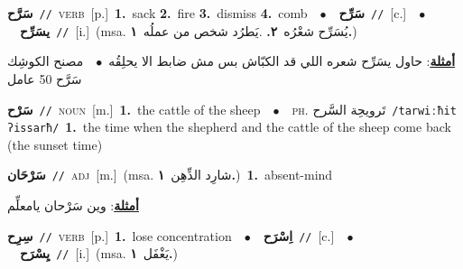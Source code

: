 \documentclass[10pt,a4paper,twoside]{article} %
\begin{document}
\begin{multicols}{2}
{\setlength\topsep{0pt}\textbf{\foreignlanguage{arabic}{سَرَّح}}\ {\color{gray}\texttt{//}\color{black}}\ \textsc{verb}\ [p.]\ \textbf{1.}~sack  \textbf{2.}~fire  \textbf{3.}~dismiss  \textbf{4.}~comb\ \ $\bullet$\ \ \setlength\topsep{0pt}\textbf{\foreignlanguage{arabic}{سَرِّح}}\ {\color{gray}\texttt{//}\color{black}}\ [c.]\ \ $\bullet$\ \ \setlength\topsep{0pt}\textbf{\foreignlanguage{arabic}{يسَرِّح}}\ {\color{gray}\texttt{//}\color{black}}\ [i.]\ \color{gray}(msa. \foreignlanguage{arabic}{يُسَرِّح شعْرُه}~\foreignlanguage{arabic}{\textbf{٢.}}  .\foreignlanguage{arabic}{يَطرُد شخص من عملُه}~\foreignlanguage{arabic}{\textbf{١.}})\color{black}\  \begin{flushright}\color{gray}\foreignlanguage{arabic}{\textbf{\underline{\foreignlanguage{arabic}{أمثلة}}}: حاول يسَرِّح شعره اللي قد الكبّاش بس مش ضابط الا يحلِقُه\ $\bullet$\ \  مصنح الكوشِك سَرَّح 50 عامل}\end{flushright}\color{black}} \vspace{2mm}

{\setlength\topsep{0pt}\textbf{\foreignlanguage{arabic}{سَرْح}}\ {\color{gray}\texttt{//}\color{black}}\ \textsc{noun}\ [m.]\ \textbf{1.}~the cattle of the sheep\ \ $\bullet$\ \ \textsc{ph.} \color{gray} \foreignlanguage{arabic}{تَرويحِة السَّرح}\color{black}\ {\color{gray}\texttt{/{\sffamily tarwiːħit ʔissarħ}/}\color{black}}\ \textbf{1.}~the time when the shepherd and the cattle of the sheep come back (the sunset time)\ } \vspace{2mm}

{\setlength\topsep{0pt}\textbf{\foreignlanguage{arabic}{سَرْحَان}}\ {\color{gray}\texttt{//}\color{black}}\ \textsc{adj}\ [m.]\ \color{gray}(msa. \foreignlanguage{arabic}{شارِد الذِّهِن}~\foreignlanguage{arabic}{\textbf{١.}})\color{black}\ \textbf{1.}~absent-mind\  \begin{flushright}\color{gray}\foreignlanguage{arabic}{\textbf{\underline{\foreignlanguage{arabic}{أمثلة}}}: وين سَرْحان يامعلِّم}\end{flushright}\color{black}} \vspace{2mm}

{\setlength\topsep{0pt}\textbf{\foreignlanguage{arabic}{سِرِح}}\ {\color{gray}\texttt{//}\color{black}}\ \textsc{verb}\ [p.]\ \textbf{1.}~lose concentration\ \ $\bullet$\ \ \setlength\topsep{0pt}\textbf{\foreignlanguage{arabic}{اِسْرَح}}\ {\color{gray}\texttt{//}\color{black}}\ [c.]\ \ $\bullet$\ \ \setlength\topsep{0pt}\textbf{\foreignlanguage{arabic}{يِسْرَح}}\ {\color{gray}\texttt{//}\color{black}}\ [i.]\ \color{gray}(msa. \foreignlanguage{arabic}{يَغْفَل}~\foreignlanguage{arabic}{\textbf{١.}})\color{black}\ } \vspace{2mm}


\end{multicols}
\end{document}
